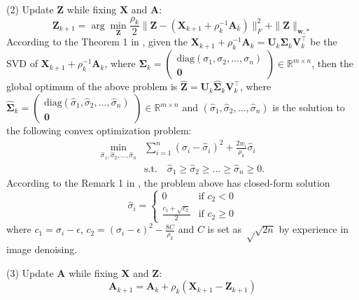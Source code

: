 \documentclass[10pt,twocolumn,letterpaper,sort&compress]{article}
\begin{document}
(2) Update $\mathbf{Z}$ while fixing $\mathbf{X}$ and $\mathbf{A}$:
\begin{equation}
\mathbf{Z}_{k+1}
=
\arg\min_{\mathbf{Z}}\frac{\rho_{k}}{2}
\|\mathbf{Z} - (\mathbf{X}_{k+1}+\rho_{k}^{-1}\mathbf{A}_{k})\|_{F}^{2}
+
\|\mathbf{Z}\|_{\bm{w},*}
\end{equation}
According to the Theorem 1 in \cite{wnnmijcv}, given the $\mathbf{X}_{k+1}+\rho_{k}^{-1}\mathbf{A}_{k}=\mathbf{U}_{k}\mathbf{\Sigma}_{k}\mathbf{V}_{k}^{\top}$ be the SVD of $\mathbf{X}_{k+1}+\rho_{k}^{-1}\mathbf{A}_{k}$, where $\mathbf{\Sigma}_{k}=
\left( \begin{array}{c}
\text{diag}(\sigma_{1},\sigma_{2},...,\sigma_{n})
\\
\mathbf{0}
\end{array} \right)
\in\mathbb{R}^{m\times n}$,
then the global optimum of the above problem is 
$\hat{\mathbf{Z}}=\mathbf{U}_{k}\hat{\mathbf{\Sigma}}_{k}\mathbf{V}_{k}^{\top}$, where 
$\hat{\mathbf{\Sigma}}_{k}=
\left( \begin{array}{c}
\text{diag}(\hat{\sigma}_{1},\hat{\sigma}_{2},...,\hat{\sigma}_{n})
\\
\mathbf{0}
\end{array} \right)
\in\mathbb{R}^{m\times n}$
and $(\hat{\sigma}_{1},\hat{\sigma}_{2},...,\hat{\sigma}_{n})$ is the solution to the following convex optimization problem:
\begin{equation}
\begin{split}
\min_{\hat{\sigma}_{1},\hat{\sigma}_{2},...,\hat{\sigma}_{n}}
&
\sum_{i=1}^{n}
(\sigma_{i}-\hat{\sigma}_{i})^{2}
+
\frac{2w_{i}}{\rho_{k}}\hat{\sigma}_{i}
\\
&
\text{s.t.}
\quad
\hat{\sigma}_{1}\ge \hat{\sigma}_{2} \ge...\ge \hat{\sigma}_{n}\ge 0.
\end{split}
\end{equation}
According to the Remark 1 in \cite{wnnmijcv}, the problem above has closed-form solution
\begin{equation}
\hat{\sigma}_{i}
=
\left\{ \begin{array}{ll}
0 & \textrm{if $c_{2}<0$}\\
\frac{c_{1}+\sqrt{c_{2}}}{2} & \textrm{if $c_{2}\ge 0$}
\end{array} \right.
\end{equation}
where $c_{1}=\sigma_{i}-\epsilon$, $c_{2} = (\sigma_{i}-\epsilon)^{2}-\frac{8C}{\rho_{k}}$ and $C$ is set as $√
\sqrt{2n}$ by experience in image denoising.
 
(3) Update $\mathbf{A}$ while fixing $\mathbf{X}$ and $\mathbf{Z}$:
\begin{equation}\label{e14}
\mathbf{A}_{k+1}
=
\mathbf{A}_{k} + \rho_{k}(\mathbf{X}_{k+1}-\mathbf{Z}_{k+1})
\end{equation}
\end{document}
